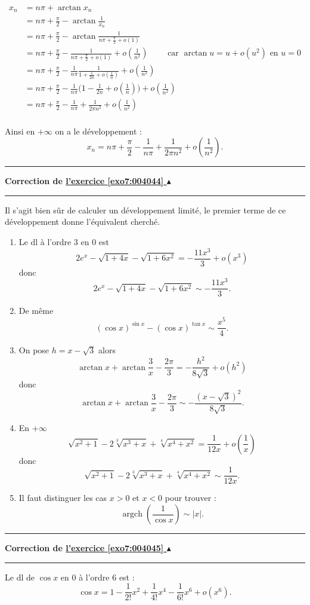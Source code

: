 \documentclass[11pt,a4paper]{article}
\newcommand{\Argch}{\mathop{\mathrm{argch}}\nolimits}
\newcounter{exo}
\newcommand{\correction}[1]{\hypertarget{cor7:#1}{}\label{cor7:#1}{\bf Correction de \hyperlink{exo7:#1}{l'exercice \ref{exo7:#1} $\blacktriangle$}}\vspace{1mm}\hrule\vspace{1mm}}
\newcommand{\fincorrection}{\vspace{1mm}\hrule\vspace*{7mm}}
\begin{document}
\begin{enumerate}
\begin{align*}
x_n 
 & = n\pi + \arctan x_n \\
 & = n\pi +\frac \pi 2 - \arctan \frac{1}{x_n} \\
 & = n\pi +\frac \pi 2 - \arctan \frac{1}{n\pi +\frac \pi 2 + o(1)} \\
 & = n\pi +\frac \pi 2 - \frac{1}{n\pi +\frac \pi 2 + o(1)} +o(\frac1{n^2}) \qquad \text{ car } \arctan u = u + o(u^2) \text{ en } u=0\\
 & = n\pi +\frac \pi 2 - \frac{1}{n\pi} \frac{1}{1+\frac{1}{2n} + o(\frac1n)}+o(\frac1{n^2}) \\
 & = n\pi +\frac \pi 2 - \frac{1}{n\pi}\big(1-\frac{1}{2n} + o(\frac1n) \big) +o(\frac1{n^2})\\
 & = n\pi +\frac \pi 2 -\frac{1}{n\pi} + \frac{1}{2\pi n^2} + o(\frac1{n^2}) \\
\end{align*}

Ainsi en $+\infty$ on a le développement :
$$x_n  = n\pi +\frac \pi 2 -\frac{1}{n\pi} + \frac{1}{2\pi n^2} + o(\frac1{n^2}).$$
\end{enumerate}
 \fincorrection
\correction{004044}

Il s'agit bien sûr de calculer un développement limité, le premier terme de ce développement donne l'équivalent cherché.

\begin{enumerate}
  \item 
Le dl à l'ordre $3$ en $0$ est 
$$2e^x - \sqrt{1+4x} - \sqrt{1+6x^2} = -\frac {11x^3}3 + o(x^3)$$
donc 
$$2e^x - \sqrt{1+4x} - \sqrt{1+6x^2} \sim -\frac {11x^3}3.$$

  \item De même 
$$(\cos x)^{\sin x} - (\cos x)^{\tan x} \sim \frac {x^5}4.$$

  \item On pose $h=x-\sqrt 3$ alors 
$$ \arctan x + \arctan \frac 3x -\frac {2\pi}3 = -\frac {h^2}{8\sqrt3} + o(h^2)$$
donc 
$$ \arctan x + \arctan \frac 3x -\frac {2\pi}3 \sim -\frac {(x-\sqrt 3)^2}{8\sqrt3}.$$

  \item En $+\infty$
$$\sqrt{x^2+1} -2\sqrt[3]{x^3+x} + \sqrt[4]{x^4+x^2}= \frac 1{12x} + o(\frac 1x)$$
donc $$\sqrt{x^2+1} -2\sqrt[3]{x^3+x} + \sqrt[4]{x^4+x^2} \sim \frac 1{12x}.$$

  \item Il faut distinguer les cas $x>0$ et $x<0$ pour trouver :
$$\Argch\left(\frac1{\cos x}\right) \sim |x|.$$
\end{enumerate}
 \fincorrection
\correction{004045}
Le dl de $\cos x$ en $0$ à l'ordre $6$ est :
$$\cos x = 1 - \frac{1}{2!} x^2 + \frac{1}{4!}x^4  - \frac{1}{6!} x^6 + o(x^6).$$
\end{document}
